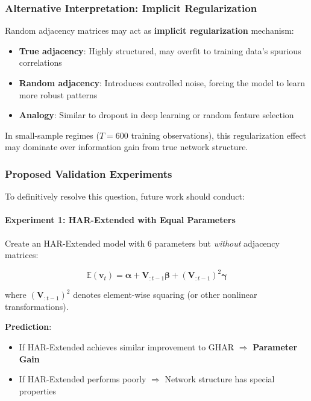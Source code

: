 \documentclass[10pt,a4paper]{article}
\begin{document}
\subsubsection{Alternative Interpretation: Implicit Regularization}

Random adjacency matrices may act as \textbf{implicit regularization} mechanism:

\begin{itemize}
\item \textbf{True adjacency}: Highly structured, may overfit to training data's spurious correlations
\item \textbf{Random adjacency}: Introduces controlled noise, forcing the model to learn more robust patterns
\item \textbf{Analogy}: Similar to dropout in deep learning or random feature selection
\end{itemize}

In small-sample regimes ($T = 600$ training observations), this regularization effect may dominate over information gain from true network structure.

\subsubsection{Proposed Validation Experiments}

To definitively resolve this question, future work should conduct:

\paragraph{Experiment 1: HAR-Extended with Equal Parameters}

Create an HAR-Extended model with 6 parameters but \textit{without} adjacency matrices:

\begin{equation}
\mathbb{E}(\mathbf{v}_t) = \boldsymbol{\alpha} + \mathbf{V}_{:t-1} \boldsymbol{\beta} + (\mathbf{V}_{:t-1})^2 \boldsymbol{\gamma}
\end{equation}

where $(\mathbf{V}_{:t-1})^2$ denotes element-wise squaring (or other nonlinear transformations).

\textbf{Prediction}:
\begin{itemize}
\item If HAR-Extended achieves similar improvement to GHAR $\Rightarrow$ \textbf{Parameter Gain}
\item If HAR-Extended performs poorly $\Rightarrow$ Network structure has special properties
\end{itemize}
\end{document}
